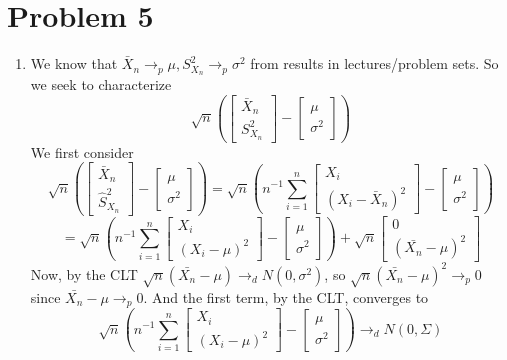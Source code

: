 \documentclass[10pt,letter]{article}
\begin{document}
\section*{Problem 5}
\begin{enumerate}[label=(\alph*)]
\item We know that $\bar{X}_n \to_p \mu, S^2_{X_n} \to_p \sigma^2$ from results in lectures/problem sets. So we seek to characterize
\[ \sqrt{n} \left( \begin{bmatrix}\bar{X}_n\\ S^2_{X_n}\end{bmatrix} - \begin{bmatrix} \mu \\ \sigma^2 \end{bmatrix}\right) \]
We first consider
\[ \sqrt{n} \left( \begin{bmatrix}\bar{X}_n\\ \hat{S}^2_{X_n}\end{bmatrix} - \begin{bmatrix} \mu \\ \sigma^2 \end{bmatrix}\right) =   \sqrt{n} \left( n^{-1} \sum_{i=1}^n \begin{bmatrix} X_i \\ (X_i - \bar{X}_n)^2\end{bmatrix} - \begin{bmatrix} \mu \\ \sigma^2 \end{bmatrix}\right) \]
\[ = \sqrt{n} \left( n^{-1}  \sum_{i=1}^n \begin{bmatrix} X_i \\ (X_i - \mu)^2\end{bmatrix} - \begin{bmatrix} \mu \\ \sigma^2 \end{bmatrix}\right) + \sqrt{n} \begin{bmatrix}0 \\ (\bar{X_n} - \mu)^2 \end{bmatrix} \]
Now, by the CLT $\sqrt{n} (\bar{X_n} - \mu ) \to_d N(0, \sigma^2)$, so $\sqrt{n} (\bar{X_n} - \mu )^2 \to_p 0$ since $\bar{X_n} - \mu \to_p 0$. And the first term, by the CLT, converges to
\[ \sqrt{n} \left( n^{-1}  \sum_{i=1}^n \begin{bmatrix} X_i \\ (X_i - \mu)^2\end{bmatrix} - \begin{bmatrix} \mu \\ \sigma^2 \end{bmatrix}\right) \to_d N(0, \Sigma)\]

\end{enumerate}
\end{document}
